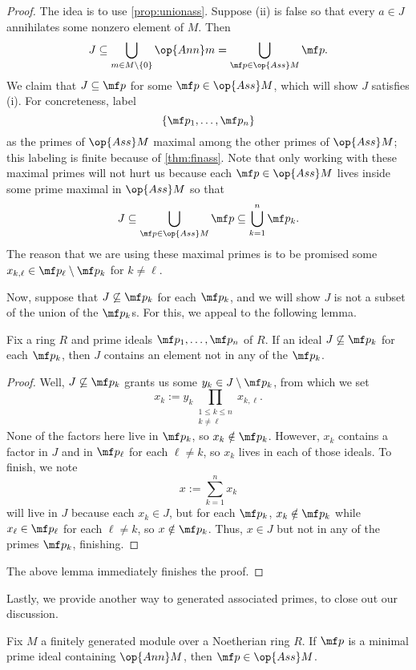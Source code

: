 \begin{proof}
	The idea is to use \autoref{prop:unionass}. Suppose (ii) is false so that every $a\in J$ annihilates some nonzero element of $M$. Then
	\[J\subseteq\bigcup_{m\in M\setminus\{0\}}\op{Ann}m=\bigcup_{\mf p\in\op{Ass}M}\mf p.\]
	We claim that $J\subseteq\mf p$ for some $\mf p\in\op{Ass}M$, which will show $J$ satisfies (i). For concreteness, label
	\[\{\mf p_1,\ldots,\mf p_n\}\]
	as the primes of $\op{Ass}M$ maximal among the other primes of $\op{Ass}M$; this labeling is finite because of \autoref{thm:finass}. Note that only working with these maximal primes will not hurt us because each $\mf p\in\op{Ass}M$ lives inside some prime maximal in $\op{Ass}M$ so that
	\[J\subseteq\bigcup_{\mf p\in\op{Ass}M}\mf p\subseteq\bigcup_{k=1}^n\mf p_k.\]
	The reason that we are using these maximal primes is to be promised some $x_{k,\ell}\in\mf p_\ell\setminus\mf p_k$ for $k\ne\ell$.
	
	Now, suppose that $J\not\subseteq\mf p_k$ for each $\mf p_k$, and we will show $J$ is not a subset of the union of the $\mf p_k$s. For this, we appeal to the following lemma.
	\begin{lemma} \label{lem:primeavoidance}
		Fix a ring $R$ and prime ideals $\mf p_1,\ldots,\mf p_n$ of $R$. If an ideal $J\not\subseteq\mf p_k$ for each $\mf p_k$, then $J$ contains an element not in any of the $\mf p_k$.
	\end{lemma}
	\begin{proof}
		Well, $J\not\subseteq\mf p_k$ grants us some $y_k\in J\setminus\mf p_k$, from which we set
		\[x_k:=y_k\prod_{\substack{1\le k\le n\\k\ne\ell}}x_{k,\ell}.\]
		None of the factors here live in $\mf p_k$, so $x_k\notin\mf p_k$. However, $x_k$ contains a factor in $J$ and in $\mf p_\ell$ for each $\ell\ne k$, so $x_k$ lives in each of those ideals. To finish, we note
		\[x:=\sum_{k=1}^nx_k\]
		will live in $J$ because each $x_k\in J$, but for each $\mf p_k$, $x_k\notin\mf p_k$ while $x_\ell\in\mf p_\ell$ for each $\ell\ne k$, so $x\notin\mf p_k$. Thus, $x\in J$ but not in any of the primes $\mf p_k$, finishing.
	\end{proof}
	The above lemma immediately finishes the proof.
\end{proof}
Lastly, we provide another way to generated associated primes, to close out our discussion.
\begin{prop} \label{prop:minassprimes}
	Fix $M$ a finitely generated module over a Noetherian ring $R$. If $\mf p$ is a minimal prime ideal containing $\op{Ann}M$, then $\mf p\in\op{Ass}M$.
\end{prop}

